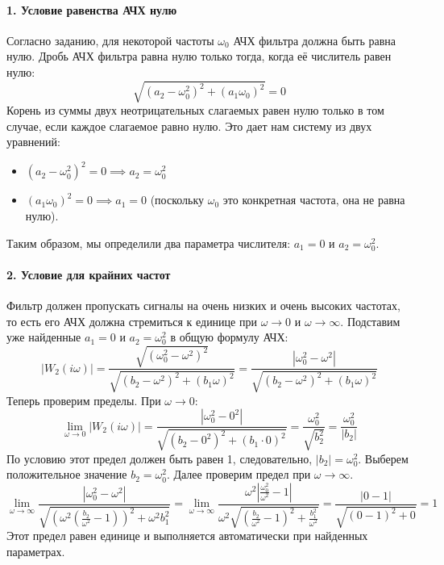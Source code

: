 \paragraph{1. Условие равенства АЧХ нулю}
Согласно заданию, для некоторой частоты $\omega_0$ АЧХ фильтра должна быть равна нулю. Дробь АЧХ фильтра равна нулю только тогда, когда её числитель равен нулю:
\begin{equation*}
    \sqrt{(a_2 - \omega_0^2)^2 + (a_1\omega_0)^2} = 0
\end{equation*}
Корень из суммы двух неотрицательных слагаемых равен нулю только в том случае, если каждое слагаемое равно нулю. Это дает нам систему из двух уравнений:
\begin{itemize}
    \item $(a_2 - \omega_0^2)^2 = 0 \implies a_2 = \omega_0^2$
    \item $(a_1\omega_0)^2 = 0 \implies a_1 = 0$ (поскольку $\omega_0$ это конкретная частота, она не равна нулю).
\end{itemize}
Таким образом, мы определили два параметра числителя: $a_1 = 0$ и $a_2 = \omega_0^2$.

\paragraph{2. Условие для крайних частот}
Фильтр должен пропускать сигналы на очень низких и очень высоких частотах, то есть его АЧХ должна стремиться к единице при $\omega \to 0$ и $\omega \to \infty$. Подставим уже найденные $a_1=0$ и $a_2=\omega_0^2$ в общую формулу АЧХ:
\begin{equation*}
    |W_2(i\omega)| = \frac{\sqrt{(\omega_0^2 - \omega^2)^2}}{\sqrt{(b_2 - \omega^2)^2 + (b_1\omega)^2}} = \frac{|\omega_0^2 - \omega^2|}{\sqrt{(b_2 - \omega^2)^2 + (b_1\omega)^2}}
\end{equation*}
Теперь проверим пределы. При $\omega \to 0$:
\begin{equation*}
    \lim_{\omega \to 0} |W_2(i\omega)| = \frac{|\omega_0^2 - 0^2|}{\sqrt{(b_2 - 0^2)^2 + (b_1 \cdot 0)^2}} = \frac{\omega_0^2}{\sqrt{b_2^2}} = \frac{\omega_0^2}{|b_2|}
\end{equation*}
По условию этот предел должен быть равен 1, следовательно, $|b_2| = \omega_0^2$. Выберем положительное значение $b_2 = \omega_0^2$.
Далее проверим предел при $\omega \to \infty$.
\begin{equation*}
    \lim_{\omega \to \infty} \frac{|\omega_0^2 - \omega^2|}{\sqrt{(\omega^2(\frac{b_2}{\omega^2} - 1))^2 + \omega^2 b_1^2}} = \lim_{\omega \to \infty} \frac{\omega^2|\frac{\omega_0^2}{\omega^2} - 1|}{\omega^2\sqrt{(\frac{b_2}{\omega^2} - 1)^2 + \frac{b_1^2}{\omega^2}}} = \frac{|0-1|}{\sqrt{(0-1)^2+0}} = 1
\end{equation*}
Этот предел равен единице и выполняется автоматически при найденных параметрах.

